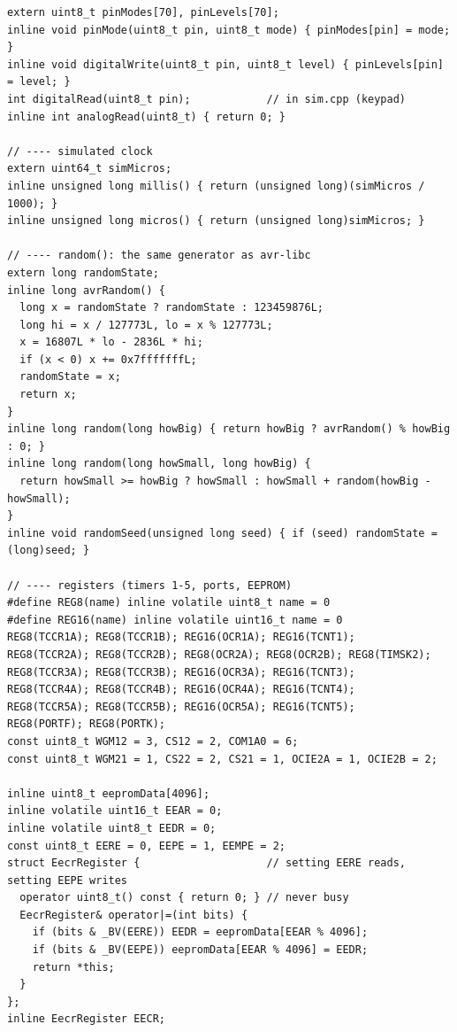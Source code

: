 \documentclass[11pt,a4paper]{article}
\begin{document}
\begin{lstlisting}[language=Arduino]
extern uint8_t pinModes[70], pinLevels[70];
inline void pinMode(uint8_t pin, uint8_t mode) { pinModes[pin] = mode; }
inline void digitalWrite(uint8_t pin, uint8_t level) { pinLevels[pin] = level; }
int digitalRead(uint8_t pin);            // in sim.cpp (keypad)
inline int analogRead(uint8_t) { return 0; }

// ---- simulated clock
extern uint64_t simMicros;
inline unsigned long millis() { return (unsigned long)(simMicros / 1000); }
inline unsigned long micros() { return (unsigned long)simMicros; }

// ---- random(): the same generator as avr-libc
extern long randomState;
inline long avrRandom() {
  long x = randomState ? randomState : 123459876L;
  long hi = x / 127773L, lo = x % 127773L;
  x = 16807L * lo - 2836L * hi;
  if (x < 0) x += 0x7fffffffL;
  randomState = x;
  return x;
}
inline long random(long howBig) { return howBig ? avrRandom() % howBig : 0; }
inline long random(long howSmall, long howBig) {
  return howSmall >= howBig ? howSmall : howSmall + random(howBig - howSmall);
}
inline void randomSeed(unsigned long seed) { if (seed) randomState = (long)seed; }

// ---- registers (timers 1-5, ports, EEPROM)
#define REG8(name) inline volatile uint8_t name = 0
#define REG16(name) inline volatile uint16_t name = 0
REG8(TCCR1A); REG8(TCCR1B); REG16(OCR1A); REG16(TCNT1);
REG8(TCCR2A); REG8(TCCR2B); REG8(OCR2A); REG8(OCR2B); REG8(TIMSK2);
REG8(TCCR3A); REG8(TCCR3B); REG16(OCR3A); REG16(TCNT3);
REG8(TCCR4A); REG8(TCCR4B); REG16(OCR4A); REG16(TCNT4);
REG8(TCCR5A); REG8(TCCR5B); REG16(OCR5A); REG16(TCNT5);
REG8(PORTF); REG8(PORTK);
const uint8_t WGM12 = 3, CS12 = 2, COM1A0 = 6;
const uint8_t WGM21 = 1, CS22 = 2, CS21 = 1, OCIE2A = 1, OCIE2B = 2;

inline uint8_t eepromData[4096];
inline volatile uint16_t EEAR = 0;
inline volatile uint8_t EEDR = 0;
const uint8_t EERE = 0, EEPE = 1, EEMPE = 2;
struct EecrRegister {                    // setting EERE reads, setting EEPE writes
  operator uint8_t() const { return 0; } // never busy
  EecrRegister& operator|=(int bits) {
    if (bits & _BV(EERE)) EEDR = eepromData[EEAR % 4096];
    if (bits & _BV(EEPE)) eepromData[EEAR % 4096] = EEDR;
    return *this;
  }
};
inline EecrRegister EECR;


\end{lstlisting}
\end{document}
